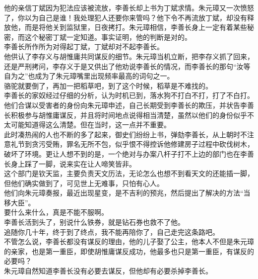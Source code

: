 \begin{multicols}{\theparacolNo}
他的亲信丁斌因为犯法应该被流放，李善长却上书为丁斌求情。朱元璋又一次愤怒了，你以为自己是谁！我处理犯人还要你来管吗？他下令不再流放丁斌，却没有释放他，而是将他关到监狱里，日夜拷打。朱元璋相信，李善长身上一定有着某些秘密，而这个秘密丁斌一定知道。事实证明，他的判断是对的。\\

李善长所作所为对得起丁斌，丁斌却对不起李善长。\\

他供认了李存义与胡惟庸共同谋反的细节。朱元璋当机立断，把李存义抓了回来，还是严刑拷问，李存义于是又供出了他劝说李善长的情况，而李善长的那句“汝等自为之”也成为了朱元璋嘴里出现频率最高的词句之一。\\

骆驼就要倒了，再加一把稻草吧，到了这个时候，稻草是不难找的。\\

李善长的家奴经过仔细的分析，认为时机已到，落水狗不打白不打，打了不白打。他们合谋以受害者的身份向朱元璋申述，自己长期受到李善长的欺压，并状告李善长积极参与胡惟庸谋反，并且将时间地点说得相当清楚，虽然以他们的身份似乎不太可能知道得这么清楚。但在当时，这一点并不重要。\\

此时凑热闹的人也不断的多了起来，御史们纷纷上书，弹劾李善长，从上朝时不注意礼节到贪污受贿，罪名无所不包，似乎恨不得控诉他修建房子过程中砍伐树木，破坏了环境。更让人想不到的是，一个绝对与办案八杆子打不上边的部门也在李善长身上踩了一脚，说来实在让人啼笑皆非。\\

这个部门是钦天监，主要负责天文历法，无论怎么也想不到看天文的还能插一脚，但他们确实做到了，可见世上无难事，只怕有心人。\\

他们向朱元璋奏报，最近出现星变，是不吉利的预兆，然后提出了解决的方法“当移大臣”。\\

要什么来什么，真是不能不服啊。\\

李善长活到头了，别说什么铁券，就是钻石券也救不了他。\\

追随你几十年，终于到了终点，我不能再陪你了，自己走完这条路吧。\\

不管怎么说，李善长都没有谋反的理由，他的儿子娶了公主，他本人不但是朱元璋的亲家，也是第一重臣，即使胡惟庸谋反成功，他最多也只是第一重臣，有谋反的必要吗？\\

朱元璋自然知道李善长没有必要去谋反，但他却有必要杀掉李善长。\\


\end{multicols}
